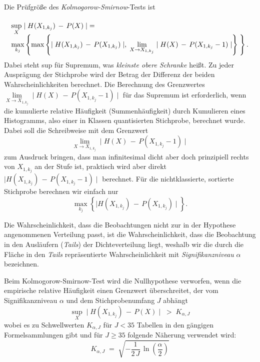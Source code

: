 Die Prüfgröße des \textsl{Kolmogorow-Smirnow}-Tests ist
\begin{equation}
\arraycolsep=2.4pt\def\arraystretch{2}
\begin{array}{l}
\sup\limits_{X} \mid H(X_{1,k_j}) \, - \, P(X) \mid \; = \;\\
\max\limits_{k_j} \left\{ \max \left\{ \mid H(X_{1,k_j}) \, - \, P(X_{1,k_j}) \mid, \;
\lim\limits_{X \rightarrow X_{1,k_j}} \mid H(X) \, - \, P(X_{1,k_j} - 1) \mid \right\} \; \right\} .
\end{array}
\end{equation}
Dabei steht sup für Supremum, was \textsl{kleinste obere Schranke} heißt.
Zu jeder Ausprägung der Stich\-probe wird der Betrag der Differenz der beiden
Wahrscheinlichkeiten berechnet. Die Berechnung des Grenzwertes
$\lim\limits_{X \rightarrow X_{1,k_j}} \mid H(X) \, - \, P(X_{1,k_j} - 1) \mid$
für das Supremum ist erforderlich, wenn die kumulierte relative Häufigkeit
(Summenhäufigkeit) durch Kumulieren eines Histogramms, also einer in Klassen
quantisierten Stichprobe, berechnet wurde. Dabei soll die Schreibweise mit
dem Grenzwert
$$
\lim\limits_{X \rightarrow X_{1,k_j}} \mid H(X) \, - \, P(X_{1,k_j} - 1) \mid
$$
zum Ausdruck bringen, dass man infinitesimal dicht aber doch prinzipiell rechts
von $X_{1,k_j}$ an der Stufe ist, praktisch wird aber direkt
$\mid H(X_{1,k_j}) \, - \, P(X_{1,k_j} - 1) \mid$
berechnet. Für die nichtklassierte, sortierte Stichprobe berechnen wir einfach nur
\begin{equation}
\max\limits_{k_j} \left\{ \mid H(X_{1,k_j}) \, - \, P(X_{1,k_j}) \mid \right\} .
\end{equation}

Die Wahrscheinlichkeit, dass die Beobachtungen nicht zur in der Hypothese angenommenen
Verteilung passt, ist die Wahrscheinlichkeit, dass die Beobachtung
in den Ausläufern (\textsl{Tails}) der Dichteverteilung liegt, weshalb wir
die durch die Fläche in den \textsl{Tails} repräsentierte Wahrscheinlichkeit mit
\textsl{Signifikanzniveau} $\alpha$ bezeichnen.

Beim Kolmogorow-Smirnow-Test wird die Nullhypothese verworfen, wenn
die empirische relative Häufigkeit einen Grenzwert überschreitet,
der vom Signifikanzniveau $\alpha$ und dem Stichprobenumfang $J$ abhängt
\begin{equation}
\sup\limits_{X} \mid H(X_{1,k_j}) \, - \, P(X) \mid \; > \; K_{\alpha, J}
\end{equation}
wobei es zu Schwellwerten $K_{\alpha, J}$ für $J < 35$ Tabellen in den gängigen
Formelsammlungen gibt und
für $J \geq 35$ folgende Näherung verwendet wird:
\begin{equation}
K_{\alpha, J} \; = \; \sqrt{-\frac{1}{2 \, J} \, \ln(\frac{\alpha}{2})}
\label{KSpruefgroesse}
\end{equation}


